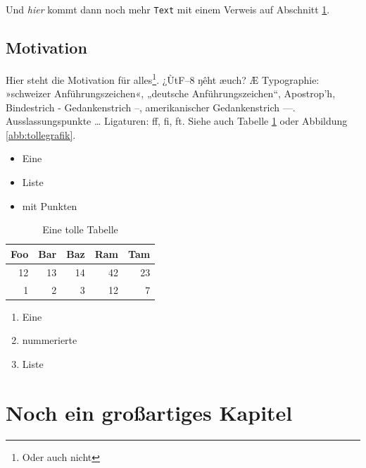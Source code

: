 \documentclass[
parskip=true,  %
fontsize=12pt, %
BCOR=12mm,     %
twoside=false,  %
numbers=noenddot %
]{scrreprt}
\begin{document}
\blindtext

Und \emph{hier} kommt dann noch mehr \texttt{Text} mit einem Verweis auf
Abschnitt \ref{sec:motivation}.

\section{Motivation}
\label{sec:motivation} %

Hier steht die Motivation für alles\footnote{Oder auch nicht\cite{wiki:latex}}.
¿ÙtF–8 ŋêht æuch? Æ Typographie: »schweizer Anführungszeichen«, „deutsche
Anführungszeichen“, Apostrop’h, Bindestrich - Gedankenstrich –, amerikanischer
Gedankenstrich —.  Ausslassungspunkte … Ligaturen: ff, fi, ft. Siehe auch
Tabelle \ref{tab:tolletab} oder Abbildung \ref{abb:tollegrafik}.

\blindtext

\begin{itemize}
\item Eine
\item Liste
\item mit Punkten

\end{itemize}

\blindtext

\begin{table}[ht]
    \centering
    \begin{tabular}{rrrrr}
        \toprule
        Foo & Bar & Baz & Ram & Tam\\
        \midrule
        12 & 13 & 14 & 42 & 23\\
        \midrule
        1  & 2  &  3 & 12 &  7\\
        \bottomrule
    \end{tabular}
    \caption{Eine tolle Tabelle}
    \label{tab:tolletab}
\end{table}


\blindtext\blindtext

\begin{enumerate}
\item Eine
\item nummerierte
\item Liste
\end{enumerate}

\blindtext

\chapter{Noch ein großartiges Kapitel}
\end{document}
